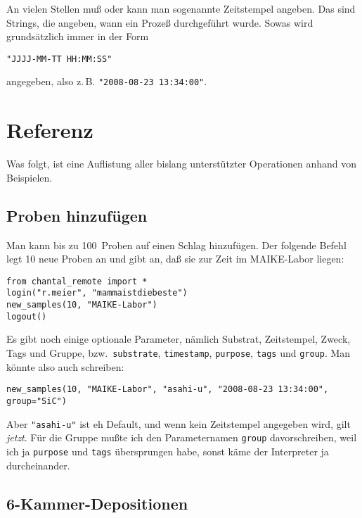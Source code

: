 \documentclass[german,11pt]{article}
\begin{document}
An vielen Stellen muß oder kann man sogenannte Zeitstempel angeben.  Das sind
Strings, die angeben, wann ein Prozeß durchgeführt wurde.  Sowas wird
grundsätzlich immer in der Form
\begin{lstlisting}
"JJJJ-MM-TT HH:MM:SS"
\end{lstlisting}
angegeben, also z.\,B. \lstinline{"2008-08-23 13:34:00"}.

\section{Referenz}

Was folgt, ist eine Auflistung aller bislang unterstützter Operationen anhand
von Beispielen.

\subsection{Proben hinzufügen}

Man kann bis zu 100~Proben auf einen Schlag hinzufügen.  Der folgende Befehl
legt 10 neue Proben an und gibt an, daß sie zur Zeit im MAIKE-Labor liegen:
\begin{lstlisting}
from chantal_remote import *
login("r.meier", "mammaistdiebeste")
new_samples(10, "MAIKE-Labor")
logout()
\end{lstlisting}
Es gibt noch einige optionale Parameter, nämlich Substrat, Zeitstempel, Zweck,
Tags und Gruppe, bzw.\ \lstinline{substrate}, \lstinline{timestamp},
\lstinline{purpose}, \lstinline{tags} und \lstinline{group}.  Man könnte also
auch schreiben:
\begin{lstlisting}
new_samples(10, "MAIKE-Labor", "asahi-u", "2008-08-23 13:34:00", group="SiC")
\end{lstlisting}
Aber \lstinline{"asahi-u"} ist eh Default, und wenn kein Zeitstempel angegeben
wird, gilt \emph{jetzt}.  Für die Gruppe mußte ich den Parameternamen
\lstinline|group| davorschreiben, weil ich ja \lstinline|purpose| und
\lstinline|tags| übersprungen habe, sonst käme der Interpreter ja
durcheinander.


\subsection{6-Kammer-Depositionen}
\end{document}

